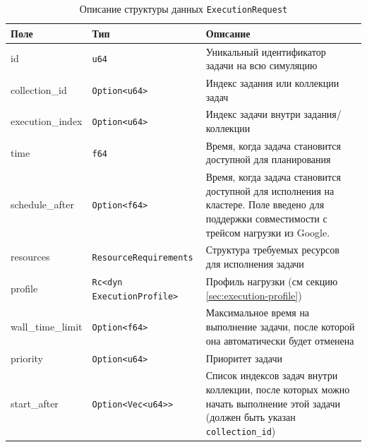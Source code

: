 \begin{table}[h]
    \centering
    \label{tab:execution_request_fields}
    \begin{tabular}{|l|l|p{8cm}|}
        \hline
        \textbf{Поле} & \textbf{Тип} & \textbf{Описание} \\
        \hline
        id & \texttt{u64} & Уникальный идентификатор задачи на всю симуляцию \\
        \hline
        collection\_id & \texttt{Option<u64>} & Индекс задания или коллекции задач  \\
        \hline
        execution\_index & \texttt{Option<u64>} & Индекс задачи внутри задания/коллекции \\
        \hline
        time & \texttt{f64} & Время, когда задача становится доступной для планирования \\
        \hline
        schedule\_after & \texttt{Option<f64>} & Время, когда задача становится доступной для исполнения на кластере. Поле введено для поддержки совместимости с трейсом нагрузки из Google. \\
        \hline
        resources & \texttt{ResourceRequirements} & Структура требуемых ресурсов для исполнения задачи \\
        \hline
        profile & \texttt{Rc<dyn ExecutionProfile>} & Профиль нагрузки (см секцию \ref{sec:execution-profile}) \\
        \hline
        wall\_time\_limit & \texttt{Option<f64>} & Максимальное время на выполнение задачи, после которой она автоматически будет отменена \\
        \hline
        priority & \texttt{Option<u64>} & Приоритет задачи \\
        \hline
        start\_after & \texttt{Option<Vec<u64>>} & Список индексов задач внутри коллекции, после которых можно начать выполнение этой задачи (должен быть указан \texttt{collection\_id}) \\
        \hline
    \end{tabular}
    \caption{Описание структуры данных \texttt{ExecutionRequest}}
    \label{tab:execution}
\end{table}

